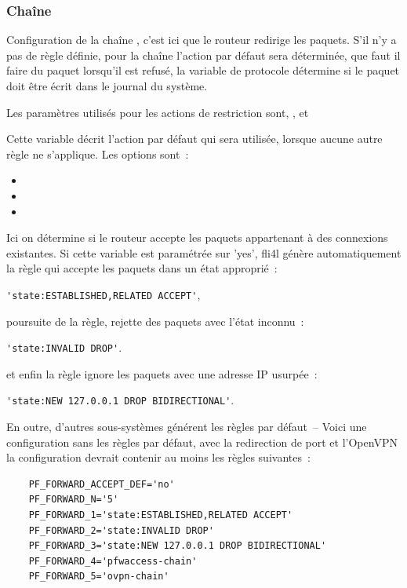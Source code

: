 \subsubsection{Chaîne }

Configuration de la chaîne , c'est ici que le routeur
redirige les paquets. S'il n'y a pas de règle définie, pour la chaîne
 l'action par défaut sera déterminée, que faut il faire du
paquet lorsqu'il est refusé, la variable de protocole détermine si le paquet
doit être écrit dans le journal du système.

Les paramètres utilisés pour les actions de restriction sont, ,
 et 

\begin{description}
Cette variable décrit l'action par défaut qui sera utilisée, lorsque aucune
autre règle ne s'applique. Les options sont~:

\begin{itemize}
\item {}
\item {}
\item {}
\end{itemize}

Ici on détermine si le routeur accepte les paquets appartenant à des connexions
existantes. Si cette variable est paramétrée sur 'yes', fli4l génère automatiquement
la règle qui accepte les paquets dans un état approprié~:

\verb+'state:ESTABLISHED,RELATED ACCEPT'+,

poursuite de la règle, rejette des paquets avec l'état inconnu~:

\verb+'state:INVALID DROP'+.

et enfin la règle ignore les paquets avec une adresse IP usurpée~:

\verb+'state:NEW 127.0.0.1 DROP BIDIRECTIONAL'+.

En outre, d'autres sous-systèmes générent les règles par défaut~-- Voici une
configuration sans les règles par défaut, avec la redirection de port et
l'OpenVPN la configuration devrait contenir au moins les règles suivantes~:

\begin{example}
\begin{verbatim}
    PF_FORWARD_ACCEPT_DEF='no'
    PF_FORWARD_N='5'
    PF_FORWARD_1='state:ESTABLISHED,RELATED ACCEPT'
    PF_FORWARD_2='state:INVALID DROP'
    PF_FORWARD_3='state:NEW 127.0.0.1 DROP BIDIRECTIONAL'
    PF_FORWARD_4='pfwaccess-chain'
    PF_FORWARD_5='ovpn-chain'
\end{verbatim}
\end{example}


\end{description}
